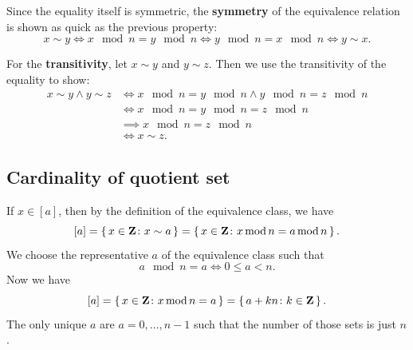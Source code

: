 \documentclass[11pt, english, fleqn, DIV=15, headinclude, BCOR=1cm]{scrartcl}
\begin{document}
Since the equality itself is symmetric, the \textbf{symmetry} of the
equivalence relation is shown as quick as the previous property:
\[
    x \sim y
    \iff
    x \mod n = y \mod n
    \iff
    y \mod n = x \mod n
    \iff
    y \sim x.
\]

For the \textbf{transitivity}, let $x \sim y$ and $y \sim z$. Then we use the
transitivity of the equality to show:
\begin{align*}
    x \sim y \land y \sim z
    &\iff
    x \mod n = y \mod n
    \land
    y \mod n = z \mod n \\
    &\iff
    x \mod n = y \mod n = z \mod n \\
    &\implies
    x \mod n = z \mod n \\
    &\iff
    x \sim z.
\end{align*}

\subsection{Cardinality of quotient set}

If $x \in [a]$, then by the definition of the equivalence class, we have
\[
    [a] = \set{x \in \ensuremath{\mathbf Z}\colon x \sim a}
    = \set{x \in \ensuremath{\mathbf Z}\colon x \operatorname{mod}n = a \operatorname{mod}n}.
\]
We choose the representative $a$ of the equivalence class such that
\[
    a \mod n = a
    \iff
    0 \leq a < n.
\]
Now we have
\[
    [a]
    = \set{x \in \ensuremath{\mathbf Z}\colon x \operatorname{mod}n = a}
    = \set{a + kn \colon k \in \ensuremath{\mathbf Z}}.
\]
The only unique $a$ are $a = 0, \ldots, n-1$ such that the number of those sets
is just $n$.
\end{document}

